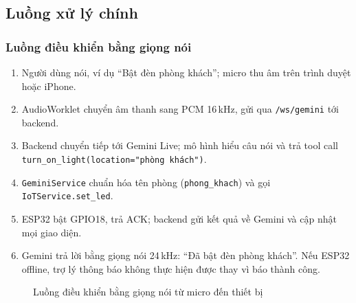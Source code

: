 \documentclass[12pt,a4paper]{extarticle}
\begin{document}
\subsection{Luồng xử lý chính}
\subsubsection{Luồng điều khiển bằng giọng nói}
\begin{enumerate}
  \item Người dùng nói, ví dụ ``Bật đèn phòng khách''; micro thu âm trên trình duyệt hoặc iPhone.
  \item AudioWorklet chuyển âm thanh sang PCM 16\,kHz, gửi qua \texttt{/ws/gemini} tới backend.
  \item Backend chuyển tiếp tới Gemini Live; mô hình hiểu câu nói và trả tool call \texttt{turn\_on\_light(location="phòng khách")}.
  \item \texttt{GeminiService} chuẩn hóa tên phòng (\texttt{phong\_khach}) và gọi \texttt{IoTService.set\_led}.
  \item ESP32 bật GPIO18, trả ACK; backend gửi kết quả về Gemini và cập nhật mọi giao diện.
  \item Gemini trả lời bằng giọng nói 24\,kHz: ``Đã bật đèn phòng khách''. Nếu ESP32 offline, trợ lý thông báo không thực hiện được thay vì báo thành công.
\end{enumerate}

\begin{figure}[H]
\centering
{}
\caption{Luồng điều khiển bằng giọng nói từ micro đến thiết bị}
\label{fig:giongnoi}
\end{figure}
\end{document}
